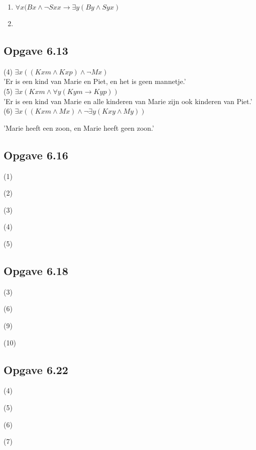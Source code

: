 \documentclass[11pt]{article}
\newcommand{\E}{\exists}
\newcommand{\A}{\forall}
\begin{document}
  \begin{enumerate}
    \item $\A x(Bx \wedge \neg Sxx \rightarrow  \E y(By \wedge Syx)$
    \item
  \end{enumerate}


  \subsection*{Opgave 6.13}

  (4) $\E x((Kxm \wedge Kxp) \wedge \neg Mx)$ \\

  'Er is een kind van Marie en Piet, en het is geen mannetje.' \\

  (5) $\E x(Kxm \wedge \A y(Kym \rightarrow Kyp))$ \\

  'Er is een kind van Marie
  en alle kinderen van Marie zijn ook kinderen van Piet.' \\

  (6) $\E x((Kxm \wedge Mx) \wedge \neg \E y(Kxy \wedge My))$

  'Marie heeft een zoon, en Marie heeft geen zoon.' \\


  \subsection*{Opgave 6.16}

  (1)

  (2)

  (3)

  (4)

  (5)

  \subsection*{Opgave 6.18}

  (3)

  (6)

  (9)

  (10)

  \subsection*{Opgave 6.22}


  (4)

  (5)

  (6)

  (7)
\end{document}
